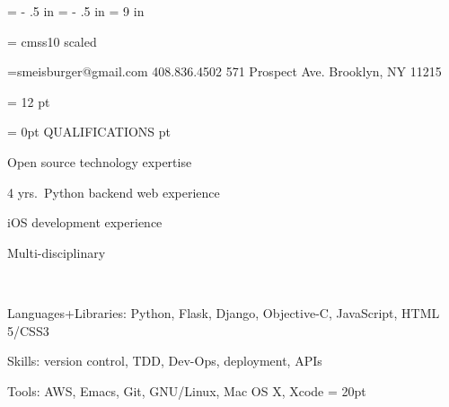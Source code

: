 





\hoffset = - .5 in
\voffset = - .5 in
\vsize = 9 in

\font\sf = cmss10 scaled 
\def\section#1{{\parindent = 0pt \sf\uppercase{#1} \vskip 20 pt}}

\nopagenumbers
\rm

\headline={\hfil smeisburger@gmail.com \hfil 408.836.4502 \hfil 571 Prospect Ave. \hfil Brooklyn, NY 11215 \hfil }

\parindent = 12 pt


\section{Qualifications}
\item{} Open source technology expertise
\item{} 4 yrs.\ Python backend web experience
\item{} iOS development experience
\item{} Multi-disciplinary
\item{} \
\item{} Languages+Libraries: Python, Flask, Django, Objective-C, JavaScript, HTML 5/CSS3
\item{} Skills: version control, TDD, Dev-Ops, deployment, APIs
\item{} Tools: AWS, Emacs, Git, GNU/Linux, Mac OS X, Xcode
\parskip = 20pt

